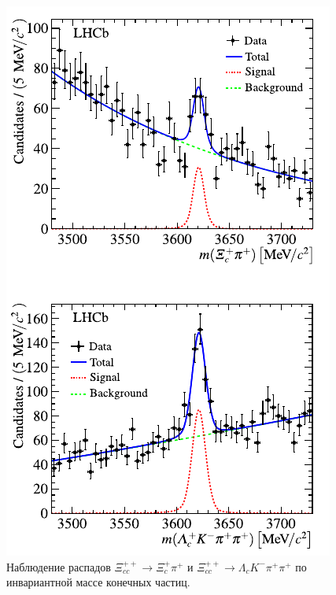 \documentclass[a4paper, 10pt, twocolumn]{article}
\begin{document}
\begin{figure}[p!]%
	\centering
	\includegraphics[width=\linewidth]{figures/xicc}
	\caption{Наблюдение распадов $\Xi_{cc}^{++}\to\Xi_c^+\pi^+$ и $\Xi_{cc}^{++} \to \Lambda_c K^-\pi^+\pi^+$ по инвариантной массе конечных частиц.}
	\label{fig:xicc}
\end{figure}%
\end{document}
